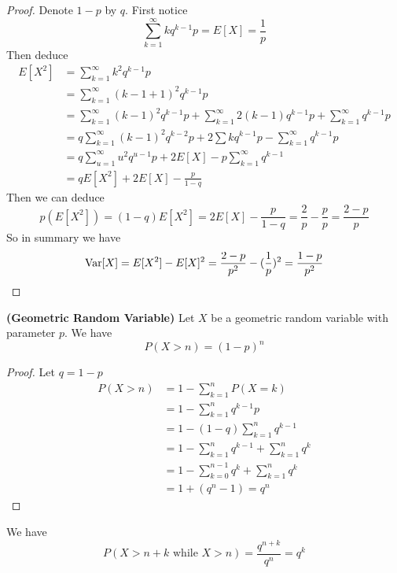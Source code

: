 \documentclass{report}
\begin{document}
\begin{proof}
  Denote $1-p$ by $q$. First notice
\begin{equation}
\sum_{k=1}^\infty kq^{k-1}p=E[X]=\frac{1}{p}
\end{equation}
Then deduce
\begin{align}
E[X^2]&=\sum_{k=1}^\infty k^2q^{k-1}p\\
&=\sum_{k=1}^\infty (k-1+1)^2q^{k-1}p\\
&=\sum_{k=1}^\infty (k-1)^2q^{k-1}p+\sum_{k=1}^\infty 2(k-1)q^{k-1}p+\sum_{k=1}^\infty q^{k-1}p\\
&=q\sum_{k=1}^\infty (k-1)^2q^{k-2}p+2\sum kq^{k-1}p-\sum_{k=1}^\infty q^{k-1}p\\
&=q\sum_{u=1}^\infty u^2q^{u-1}p+2E[X]-p\sum_{k=1}^\infty q^{k-1}\\
&=qE[X^2]+2E[X]-\frac{p}{1-q}
\end{align}
Then we can deduce
\begin{equation}
 p(E[X^2])= (1-q)E[X^2]=2E[X]-\frac{p}{1-q}=\frac{2}{p}-\frac{p}{p}=\frac{2-p}{p}
\end{equation}
So in summary we have
\begin{equation}
\text{Var} [X]=E[X^2]-E[X]^2=\frac{2-p}{p^2}-(\frac{1}{p})^2=\frac{1-p}{p^2}
\end{equation}
\end{proof}
\begin{theorem}
\textbf{(Geometric Random Variable)} Let $X$ be a geometric random variable with parameter $p$. We have
\begin{equation}
P(X>n)=(1-p)^n
\end{equation}
\end{theorem}
\begin{proof}
Let $q=1-p$
\begin{align}
P(X>n)&=1-\sum_{k=1}^n P(X=k)\\
&=1-\sum_{k=1}^n q^{k-1}p\\
&=1-(1-q)\sum_{k=1}^n q^{k-1}\\
&=1-\sum_{k=1}^n q^{k-1}+\sum_{k=1}^n q^{k}\\
&=1-\sum_{k=0}^{n-1} q^k+\sum_{k=1}^n q^k\\
&=1+(q^n-1)=q^n
\end{align}
\end{proof}
\begin{corollary}
We have
\begin{equation}
  P(X>n+k\text{ while }X>n)=\frac{q^{n+k}}{q^{n}}=q^k
\end{equation}
\end{corollary}
\end{document}
